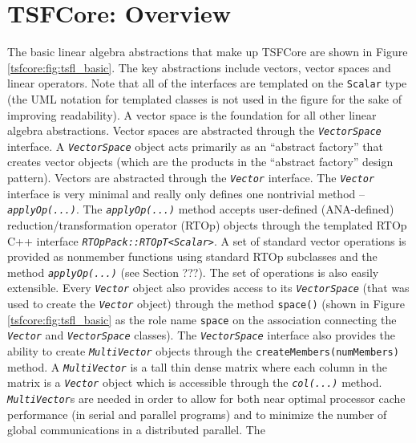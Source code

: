 \documentclass[10pt,fleqn]{article}
\begin{document}
%
\section{TSFCore: Overview}
\label{tsfcore:sec:TSFCore_core_overview}
%

The basic linear algebra abstractions that make up TSFCore are shown in
Figure \ref{tsfcore:fig:tsfl_basic}.  The key abstractions include
vectors, vector spaces and linear operators.  Note that all of the interfaces
are templated on the \texttt{Scalar} type (the UML notation for
templated classes is not used in the figure for the sake of improving
readability).  A vector space is the foundation for all other linear
algebra abstractions.  Vector spaces are abstracted through the
\texttt{\textit{VectorSpace}} interface.  A
\texttt{\textit{VectorSpace}} object acts primarily as an ``abstract
factory'' \cite{ref:gama_et_al_1995} that creates vector objects
(which are the products in the ``abstract factory'' design pattern).
Vectors are abstracted through the \texttt{\textit{Vector}} interface.
The \texttt{\textit{Vector}} interface is very minimal and really only
defines one nontrivial method -- \texttt{\textit{applyOp(...)}}.  The
\texttt{\textit{applyOp(...)}} method accepts user-defined
(ANA-defined) reduction/transformation operator (RTOp) objects through
the templated RTOp C++ interface \texttt{\textit{RTOpPack::RTOpT<Scalar>}}.
A set of standard vector operations is provided as nonmember functions
using standard RTOp subclasses and the method
\texttt{\textit{applyOp(...)}}  (see Section ???).  The set of operations
is also easily extensible.  Every \texttt{\textit{Vector}} object also
provides access to its \texttt{\textit{VectorSpace}} (that was used to
create the \texttt{\textit{Vector}} object) through the method
\texttt{space()} (shown in Figure \ref{tsfcore:fig:tsfl_basic} as the
role name \texttt{space} on the association connecting the
\texttt{\textit{Vector}} and \texttt{\textit{VectorSpace}} classes).
The \texttt{\textit{VectorSpace}} interface also provides the ability
to create \texttt{\textit{MultiVector}} objects through the
\texttt{createMembers(numMembers)} method.  A \texttt{\textit{MultiVector}}
is a tall thin dense matrix where each column in the matrix is a
\texttt{\textit{Vector}} object which is accessible through the
\texttt{\textit{col(...)}} method.  \texttt{\textit{MultiVector}}s
are needed in order to allow for both near optimal processor cache
performance (in serial and parallel programs) and to minimize the
number of global communications in a distributed parallel.  The
\end{document}

